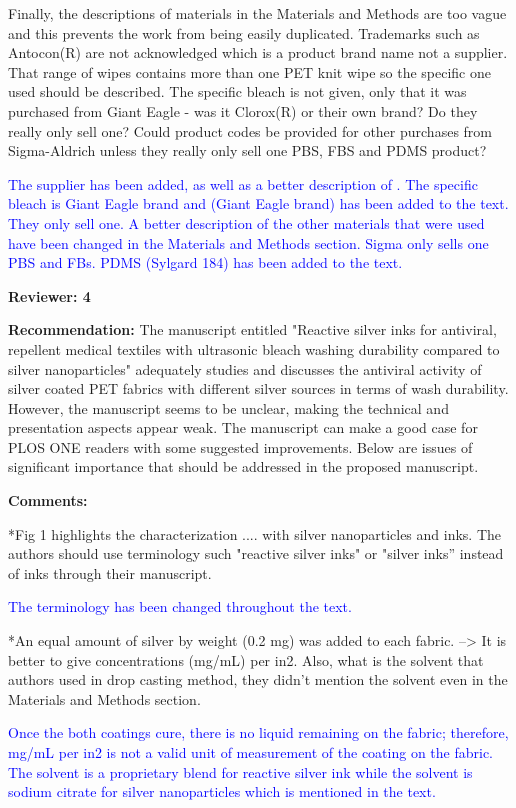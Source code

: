 \documentclass[12pt]{letter}
\newcommand{\blue}[1]{\textcolor{blue}{#1}} %
\begin{document}
Finally, the descriptions of materials in the Materials and Methods are too vague and this prevents the work from being easily duplicated. Trademarks such as Antocon(R) are not acknowledged which is a product brand name not a supplier. That range of wipes contains more than one PET knit wipe so the specific one used should be described. The specific bleach is not given, only that it was purchased from Giant Eagle - was it Clorox(R) or their own brand? Do they really only sell one? Could product codes be provided for other purchases from Sigma-Aldrich unless they really only sell one PBS, FBS and PDMS product?

\blue{The supplier has been added, as well as a better description of . The specific bleach is Giant Eagle brand and (Giant Eagle brand) has been added to the text. They only sell one. A better description of the other materials that were used have been changed in the Materials and Methods section. Sigma only sells one PBS and FBs. PDMS (Sylgard 184) has been added to the text. }

\newpage
\textbf{Reviewer: 4}

\textbf{Recommendation:} 
The manuscript entitled "Reactive silver inks for antiviral, repellent medical textiles with ultrasonic bleach washing durability compared to silver nanoparticles" adequately studies and discusses the antiviral activity of silver coated PET fabrics with different silver sources in terms of wash durability. However, the manuscript seems to be unclear, making the technical and presentation aspects appear weak. The manuscript can make a good case for PLOS ONE readers with some suggested improvements. Below are issues of significant importance that should be addressed in the proposed manuscript.

\textbf{Comments:} 

*Fig 1 highlights the characterization .... with silver nanoparticles and inks. The authors should use terminology such "reactive silver inks" or "silver inks” instead of inks through their manuscript.

\blue{The terminology has been changed throughout the text. }

*An equal amount of silver by weight (0.2 mg) was added to each fabric. --> It is better to give concentrations (mg/mL) per in2. Also, what is the solvent that authors used in drop casting method, they didn't mention the solvent even in the Materials and Methods section.

\blue{Once the both coatings cure, there is no liquid remaining on the fabric; therefore, mg/mL per in2 is not a valid unit of measurement of the coating on the fabric. The solvent is a proprietary blend for reactive silver ink while the solvent is sodium citrate for silver nanoparticles which is mentioned in the text. }
\end{document}
